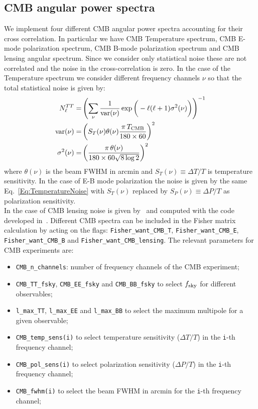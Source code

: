 \documentclass[prd,nofootinbib,showpacs]{revtex4}
\newcommand{\code}[1]{\lstinline|#1|}
\begin{document}
\subsection{CMB angular power spectra} \label{SubSec:CMBSpectra}
%
We implement four different CMB angular power spectra accounting for their cross correlation.
In particular we have CMB Temperature spectrum, CMB E-mode polarization spectrum, CMB B-mode polarization spectrum and CMB lensing angular spectrum.
%
Since we consider only statistical noise these are not correlated and the noise in the cross-correlation is zero. 
In the case of the Temperature spectrum we consider different frequency channels $\nu$ so that the total statistical noise is given by:
%
\begin{align} \label{Eq:TemperatureNoise}
N_{\ell}^{TT} =& \left( \sum_{\nu} \frac{1}{\rm var(\nu)} \exp \bigg ( -\ell (\ell+1) \sigma^2(\nu) \bigg)  \right)^{-1} \nonumber \\
{\rm var}(\nu) =& \left( S_T(\nu) \theta(\nu) \frac{\pi \, T_{\rm CMB} }{180 \times 60} \right)^2 \nonumber \\
\sigma^2(\nu) =& \left( \frac{\pi \, \theta(\nu) }{180 \times 60 \sqrt{8 \log 2} } \right)^2
\end{align}
%
where $\theta(\nu)$ is the beam FWHM in arcmin and $S_T(\nu) \equiv \Delta T / T$ is temperature sensitivity.
%
In the case of E-B mode polarization the noise is given by the same Eq.~\ref{Eq:TemperatureNoise} with $S_T(\nu)$ replaced by $S_P(\nu) \equiv \Delta P / T$ as polarization sensitivity. \\
%
In the case of CMB lensing noise is given by~\cite{Hu:2001kj} and computed with the code developed in~\cite{Perotto:2006rj}.
%
Different CMB spectra can be included in the Fisher matrix calculation by acting on the flags: \code{Fisher_want_CMB_T}, \code{Fisher_want_CMB_E}, \code{Fisher_want_CMB_B} and \code{Fisher_want_CMB_lensing}.
The relevant parameters for CMB experiments are:
%
\begin{itemize}
\item \code{CMB_n_channels}: number of frequency channels of the CMB experiment;
\item \code{CMB_TT_fsky}, \code{CMB_EE_fsky} and \code{CMB_BB_fsky} to select $f_{\rm sky}$ for different observables;
\item \code{l_max_TT}, \code{l_max_EE} and \code{l_max_BB} to select the maximum multipole for a given observable;
\item \code{CMB_temp_sens(i)} to select temperature sensitivity ($\Delta T / T$) in the \code{i}-th frequency channel;
\item \code{CMB_pol_sens(i)} to select polarization sensitivity ($\Delta P / T$) in the \code{i}-th frequency channel;
\item \code{CMB_fwhm(i)}  to select the beam FWHM in arcmin for the \code{i}-th frequency channel;
\end{itemize}
\end{document}
